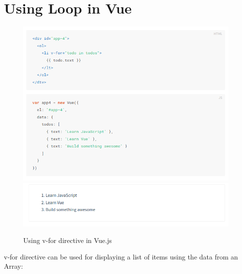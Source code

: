 \documentclass[12pt,a4paper,oneside]{report}
\begin{document}
\section{Using Loop in Vue}
\begin{figure}[H]
    \begin{center}
        \label{abc}
            \includegraphics[scale=.6]{v-for.png}
            \includegraphics[scale=.6]{v-forOutput.png}
            \caption{Using v-for directive  in Vue.js \cite{vue-code} }
    \end{center}
\end{figure}
\begin{center}
    
\end{center}
    v-for directive can be used for displaying a list of items using the data from an Array:
    
\end{document}
